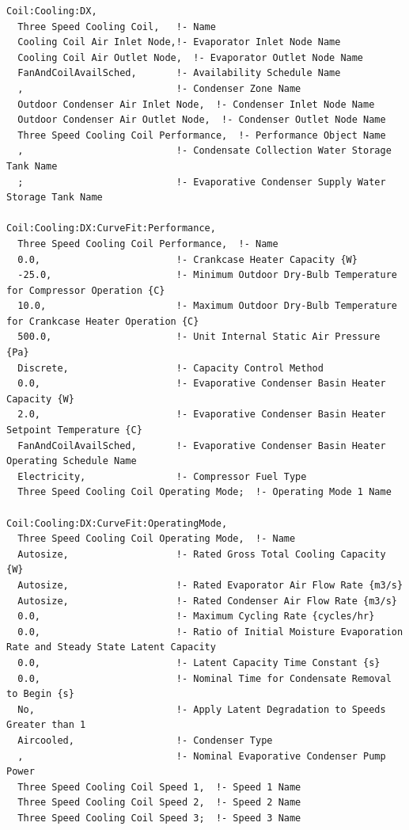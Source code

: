 \begin{lstlisting}
Coil:Cooling:DX,
  Three Speed Cooling Coil,   !- Name
  Cooling Coil Air Inlet Node,!- Evaporator Inlet Node Name
  Cooling Coil Air Outlet Node,  !- Evaporator Outlet Node Name
  FanAndCoilAvailSched,       !- Availability Schedule Name
  ,                           !- Condenser Zone Name
  Outdoor Condenser Air Inlet Node,  !- Condenser Inlet Node Name
  Outdoor Condenser Air Outlet Node,  !- Condenser Outlet Node Name
  Three Speed Cooling Coil Performance,  !- Performance Object Name
  ,                           !- Condensate Collection Water Storage Tank Name
  ;                           !- Evaporative Condenser Supply Water Storage Tank Name

Coil:Cooling:DX:CurveFit:Performance,
  Three Speed Cooling Coil Performance,  !- Name
  0.0,                        !- Crankcase Heater Capacity {W}
  -25.0,                      !- Minimum Outdoor Dry-Bulb Temperature for Compressor Operation {C}
  10.0,                       !- Maximum Outdoor Dry-Bulb Temperature for Crankcase Heater Operation {C}
  500.0,                      !- Unit Internal Static Air Pressure {Pa}
  Discrete,                   !- Capacity Control Method
  0.0,                        !- Evaporative Condenser Basin Heater Capacity {W}
  2.0,                        !- Evaporative Condenser Basin Heater Setpoint Temperature {C}
  FanAndCoilAvailSched,       !- Evaporative Condenser Basin Heater Operating Schedule Name
  Electricity,                !- Compressor Fuel Type
  Three Speed Cooling Coil Operating Mode;  !- Operating Mode 1 Name

Coil:Cooling:DX:CurveFit:OperatingMode,
  Three Speed Cooling Coil Operating Mode,  !- Name
  Autosize,                   !- Rated Gross Total Cooling Capacity {W}
  Autosize,                   !- Rated Evaporator Air Flow Rate {m3/s}
  Autosize,                   !- Rated Condenser Air Flow Rate {m3/s}
  0.0,                        !- Maximum Cycling Rate {cycles/hr}
  0.0,                        !- Ratio of Initial Moisture Evaporation Rate and Steady State Latent Capacity
  0.0,                        !- Latent Capacity Time Constant {s}
  0.0,                        !- Nominal Time for Condensate Removal to Begin {s}
  No,                         !- Apply Latent Degradation to Speeds Greater than 1
  Aircooled,                  !- Condenser Type
  ,                           !- Nominal Evaporative Condenser Pump Power
  Three Speed Cooling Coil Speed 1,  !- Speed 1 Name
  Three Speed Cooling Coil Speed 2,  !- Speed 2 Name
  Three Speed Cooling Coil Speed 3;  !- Speed 3 Name


\end{lstlisting}
